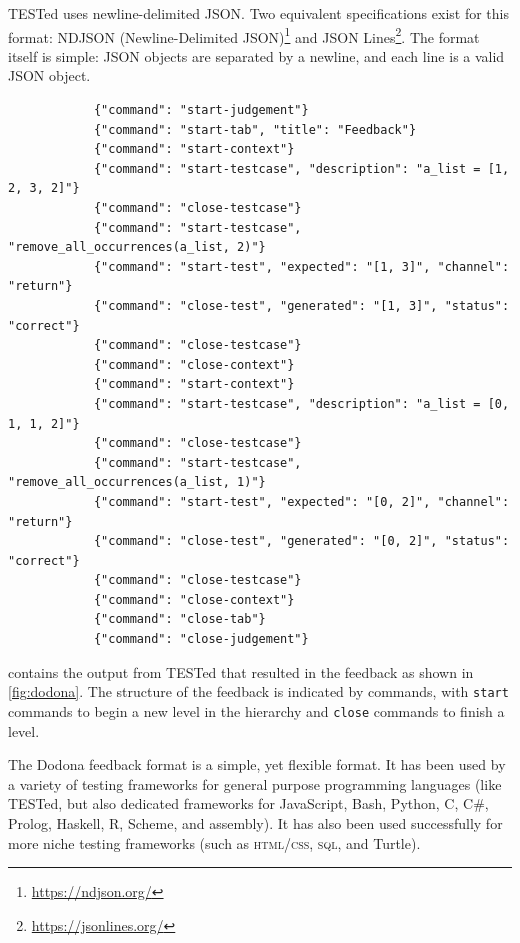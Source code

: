\documentclass[../main]{subfiles}
\begin{document}
TESTed uses newline-delimited JSON\@.
Two equivalent specifications exist for this format: NDJSON (Newline-Delimited JSON)\footnote{\url{https://ndjson.org/}} and JSON Lines\footnote{\url{https://jsonlines.org/}}.
The format itself is simple: JSON objects are separated by a newline, and each line is a valid JSON object.

\begin{listing}
    \begin{wide}
        \begin{verbatim}
            {"command": "start-judgement"}
            {"command": "start-tab", "title": "Feedback"}
            {"command": "start-context"}
            {"command": "start-testcase", "description": "a_list = [1, 2, 3, 2]"}
            {"command": "close-testcase"}
            {"command": "start-testcase", "remove_all_occurrences(a_list, 2)"}
            {"command": "start-test", "expected": "[1, 3]", "channel": "return"}
            {"command": "close-test", "generated": "[1, 3]", "status": "correct"}
            {"command": "close-testcase"}
            {"command": "close-context"}
            {"command": "start-context"}
            {"command": "start-testcase", "description": "a_list = [0, 1, 1, 2]"}
            {"command": "close-testcase"}
            {"command": "start-testcase", "remove_all_occurrences(a_list, 1)"}
            {"command": "start-test", "expected": "[0, 2]", "channel": "return"}
            {"command": "close-test", "generated": "[0, 2]", "status": "correct"}
            {"command": "close-testcase"}
            {"command": "close-context"}
            {"command": "close-tab"}
            {"command": "close-judgement"}
        \end{verbatim}
    \end{wide}
    \caption{
        Example of the output generated by TESTed, which is rendered in \cref{fig:dodona}.
        As before, each context consists of two test cases, the first of which has no explicit tests, while the second has one test (the expected return value).
    }
    \label{lst:tested-output-example}
\end{listing}

 contains the output from TESTed that resulted in the feedback as shown in \cref{fig:dodona}.
The structure of the feedback is indicated by commands, with \texttt{start} commands to begin a new level in the hierarchy and \texttt{close} commands to finish a level.

The Dodona feedback format is a simple, yet flexible format.
It has been used by a variety of testing frameworks for general purpose programming languages (like TESTed, but also dedicated frameworks for JavaScript, Bash, Python, C, C\#, Prolog, Haskell, R, Scheme, and assembly).
It has also been used successfully for more niche testing frameworks (such as \textsc{html}/\textsc{css}, \textsc{sql}, and Turtle).
\end{document}
